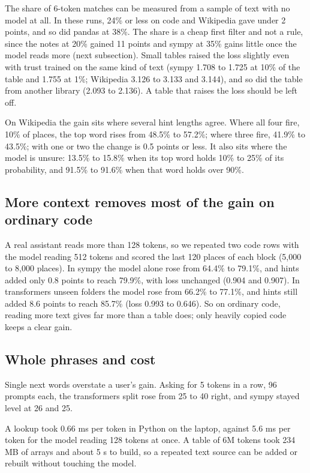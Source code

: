 \documentclass[11pt]{article}
\begin{document}
The share of 6-token matches can be measured from a sample of text with no model at all. In these runs, 24\% or less on code and Wikipedia gave under 2 points, and so did pandas at 38\%. The share is a cheap first filter and not a rule, since the notes at 20\% gained 11 points and sympy at 35\% gains little once the model reads more (next subsection). Small tables raised the loss slightly even with trust trained on the same kind of text (sympy 1.708 to 1.725 at 10\% of the table and 1.755 at 1\%; Wikipedia 3.126 to 3.133 and 3.144), and so did the table from another library (2.093 to 2.136). A table that raises the loss should be left off.

On Wikipedia the gain sits where several hint lengths agree. Where all four fire, 10\% of places, the top word rises from 48.5\% to 57.2\%; where three fire, 41.9\% to 43.5\%; with one or two the change is 0.5 points or less. It also sits where the model is unsure: 13.5\% to 15.8\% when its top word holds 10\% to 25\% of its probability, and 91.5\% to 91.6\% when that word holds over 90\%.

\subsection{More context removes most of the gain on ordinary code}
A real assistant reads more than 128 tokens, so we repeated two code rows with the model reading 512 tokens and scored the last 120 places of each block (5,000 to 8,000 places). In sympy the model alone rose from 64.4\% to 79.1\%, and hints added only 0.8 points to reach 79.9\%, with loss unchanged (0.904 and 0.907). In transformers unseen folders the model rose from 66.2\% to 77.1\%, and hints still added 8.6 points to reach 85.7\% (loss 0.993 to 0.646). So on ordinary code, reading more text gives far more than a table does; only heavily copied code keeps a clear gain.

\subsection{Whole phrases and cost}
Single next words overstate a user's gain. Asking for 5 tokens in a row, 96 prompts each, the transformers split rose from 25 to 40 right, and sympy stayed level at 26 and 25.

A lookup took 0.66 ms per token in Python on the laptop, against 5.6 ms per token for the model reading 128 tokens at once. A table of 6M tokens took 234 MB of arrays and about 5 s to build, so a repeated text source can be added or rebuilt without touching the model.
\end{document}
